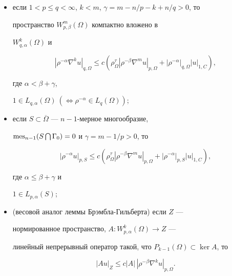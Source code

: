 \begin{itemize}


\item[1)] если $1 < p \le q < \infty$, $k <m$, $\gamma=m-n/p-k+n/q >0$, то 


пространство $W^m_{p,\beta}(\Omega)$ компактно вложено в 


$W^k_{q,\alpha}(\Omega)$ и 


\begin{equation} \label{W-W}


{|\rho^{-\alpha}\nabla ^k u|}_{q,\Omega} \le c 


( {\rho}_\Omega^\tau {|\rho^{-\beta}\nabla ^m u|}_{p,\Omega} + 


{|\rho^{-\alpha}|}_{q,\Omega}{|u|}_{1, C}),


\end{equation}


где $\alpha < \beta+\gamma$, 


$1 \in L_{q,\alpha}(\Omega)


\ (\Leftrightarrow \rho^{-\alpha} \in L_q(\Omega))$;


\item[2)] если $S \subset \overline{\Omega}$ --- $n-1$-мерное многообразие, 


$\operatorname{mes}_{n-1}(S \bigcap \Gamma_0)=0$ и $\gamma=m-1/p >0$, то 


\begin{equation} \label{L_p(S)} 


{|\rho^{-\alpha}u|}_{p,S} \le c ( {\rho}_\Omega^\tau 


{|\rho^{-\beta}\nabla^m u|}_{p,\Omega}+{|\rho^{-\alpha}|}_{p,S}{|u|}_{1,C}),


\end{equation} 


где $\alpha \le \beta+\gamma$ и 


$1 \in L_{p,\alpha}(S)$;


\item[3)] (весовой аналог леммы Брэмбла-Гильберта) если $Z$ --- 


нормированное пространство, $A:W^k_{p,\alpha}(\Omega) \rightarrow Z$ ---


линейный непрерывный оператор такой, что $P_{k-1}(\Omega) \subset \ker A$, то 


\begin{equation} \label{A:W-Z}


{|Au|}_Z \le c |A|\,{|\rho^{-\beta}\nabla ^k u|}_{p,\Omega}. 


\end{equation}


\end{itemize}





